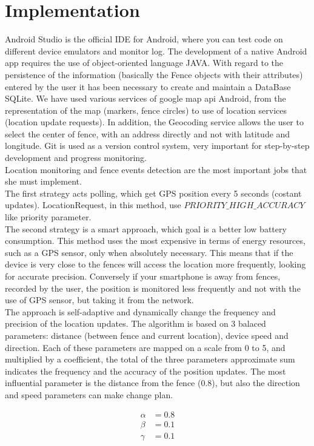 \documentclass[conference]{IEEEtran}
\begin{document}
\section{Implementation}
Android Studio is the official IDE for Android, where you can test code on different device emulators and monitor log.
The development of a native Android app requires the use of object-oriented language JAVA.
With regard to the persistence of the information (basically the Fence objects with their attributes) entered by the user it has been necessary to create and maintain a DataBase SQLite.
We have used various services of google map api Android, from the representation of the map (markers, fence circles) to use of location services (location update requests).
In addition, the Geocoding service allows the user to select the center of fence, with an address directly and not with latitude and longitude.
Git is used as a version control system, very important for step-by-step development and progress monitoring.\\
Location monitoring and fence events detection are the most important jobs that she must implement.\\
The first strategy acts polling, which get GPS position every 5 seconds (costant updates). LocationRequest, in this method, use $PRIORITY\_HIGH\_ACCURACY$ like priority parameter.\\
The second strategy is a smart approach, which goal is a better low battery consumption.
This method uses the most expensive in terms of energy resources, such as a GPS sensor, only when absolutely necessary. This means that if the device is very close to the fences will access the location more frequently, 
looking for accurate precision. Conversely if your smartphone is away from fences, recorded by the user, the position is monitored less frequently and not with the use of GPS sensor, but taking it from the network.\\
The approach is self-adaptive and dynamically change the frequency and precision of the location updates.
The algorithm is based on 3 balaced parameters: distance (between fence and current location), device speed and direction.
Each of these parameters are mapped on a scale from 0 to 5, and multiplied by a coefficient, the total of the three parameters approximate sum indicates the frequency and 
the accuracy of the position updates.
The most influential parameter is the distance from the fence (0.8), but also the direction and speed parameters can make change plan.

\begin{subequations}\label{grp}
  \begin{align}
    \alpha&=0.8\label{second}\\
    \beta&=0.1\label{third}\\
    \gamma&=0.1\label{fourth}
  \end{align}
\end{subequations}
\end{document}
